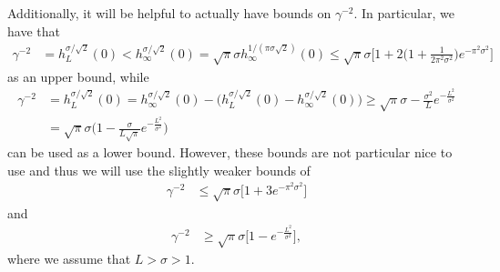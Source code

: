 \documentclass[../thesis-main/thesis-main]{subfiles}
\begin{document}
Additionally, it will be helpful to actually have bounds on $\gamma^{-2}$.  In particular, we have that
\begin{align}
  \gamma^{-2} &= h_{L}^{\sigma/\sqrt{2}}(0)   < h_{\infty}^{\sigma/\sqrt{2}}(0)
     = \sqrt{\pi} \sigma h_{\infty}^{1/(\pi \sigma \sqrt{2})} (0)
     \leq \sqrt{\pi} \sigma \Big[ 1 + 2 \Big( 1 + \frac{1}{2\pi^2\sigma^2}\Big) e^{ - \pi^2\sigma^2}\Big]
\end{align}
as an upper bound, while
\begin{align}
  \gamma^{-2} &= h_{L}^{\sigma/\sqrt{2}}(0) = h_{\infty}^{\sigma/\sqrt{2}}(0) - \big( h_{L}^{\sigma/\sqrt{2}}(0) - h_\infty^{\sigma/\sqrt{2}}(0)\big) \geq \sqrt{\pi} \sigma - \frac{\sigma^2}{L} e^{-\frac{L^2}{\sigma^2}} \\
   &= \sqrt{\pi} \sigma \Big(1 - \frac{\sigma}{L\sqrt{\pi}} e^{ - \frac{L^2}{\sigma^2}}\Big) 
\end{align}
can be used as a lower bound.  However, these bounds are not particular nice to use and thus we will use the slightly weaker bounds of
\begin{align}
  \gamma^{-2} & \leq \sqrt{\pi}\sigma \big[ 1 + 3 e^{-\pi^2 \sigma^2}\big]\label{eq:gaussian_gamma_upper_bound}
\end{align}
and
\begin{align}
  \gamma^{-2} & \geq \sqrt{\pi} \sigma \big[ 1 - e^{-\frac{L^2}{\sigma^2}}\big],\label{eq:gaussian_gamma_lower_bound}
\end{align}
where we assume that $L > \sigma > 1$.
\end{document}
